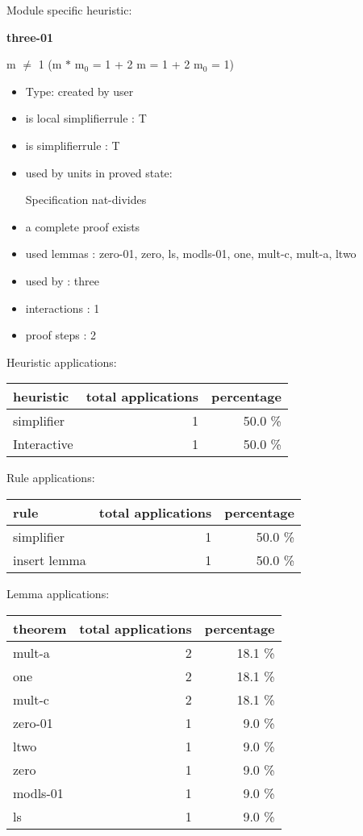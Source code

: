 \documentclass[a4paper]{article}
\begin{document}
Module specific heuristic:

\pagebreak

{\LARGE\bf three-01}\label{lemma-three-01}

\medskip

 \Fol m $\neq$ 1 \Imp (m $*$ $\mbox{m}_{0}$ = 1 + 2 \Equiv m = 1 + 2 \And $\mbox{m}_{0}$ = 1)

\begin{itemize}

\item Type: created by user

\item is local simplifierrule : T
\item is simplifierrule : T
\item used by units in proved state:

Specification nat-divides
\item       a complete proof exists
\item       used lemmas  : zero-01, zero, ls, modls-01, one, mult-c, mult-a, ltwo
\item       used by      : three
\item       interactions : 1
\item       proof steps  : 2
\end{itemize}

\medskip


Heuristic applications:

\begin{supertabular}{l|r|r}
heuristic	& total applications & percentage \\ \hline
simplifier & 1 & 50.0 \% \\
Interactive & 1 & 50.0 \% \\

\end{supertabular}

Rule applications:

\begin{supertabular}{l|r|r}
rule	        & total applications & percentage \\ \hline
simplifier & 1 & 50.0 \% \\
insert lemma & 1 & 50.0 \% \\

\end{supertabular}

Lemma applications:

\begin{supertabular}{l|r|r}
theorem	        & total applications & percentage \\ \hline
mult-a & 2 & 18.1 \% \\
one & 2 & 18.1 \% \\
mult-c & 2 & 18.1 \% \\
zero-01 & 1 & 9.0 \% \\
ltwo & 1 & 9.0 \% \\
zero & 1 & 9.0 \% \\
modls-01 & 1 & 9.0 \% \\
ls & 1 & 9.0 \% \\

\end{supertabular}
\end{document}
